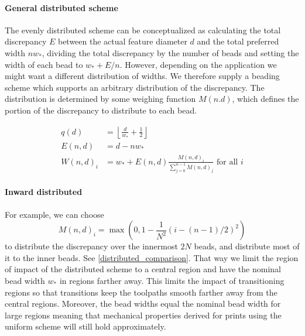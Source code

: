 \paragraph{General distributed scheme}
The evenly distributed scheme can be conceptualized as calculating the total discrepancy $E$ between the actual feature diameter $d$ and the total preferred width $n w_*$, dividing the total discrepancy by the number of beads and setting the width of each bead to 
$w_* + E / n$.
However, depending on the application we might want a different distribution of widths.
We therefore supply a beading scheme which supports an arbitrary distribution of the discrepancy.
The distribution is determined by some weighing function $M(n.d)$, which defines the portion of the discrepancy to distribute to each bead.


\begin{align*}
q(d) &= \left\lfloor \frac{d}{ w_*} + \frac12 \right\rfloor \\
E(n,d) &= d - n w_* \\
W(n,d)_i &= w_* + E(n,d) \frac{M(n,d)_i}{\sum_{j=0}^{n-1} M(n,d)_j} \text{ for all } i 
\end{align*}


\paragraph{Inward distributed}
For example, we can choose 
$$M(n,d)_i = \max(0, 1 - \frac{1}{N^2} (i - (n-1)/2)^2 )$$
to distribute the discrepancy over the innermost $2N$ beads, and distribute most of it to the inner beads.
See \cref{distributed_comparison}.
That way we limit the region of impact of the distributed scheme to a central region and have the nominal bead width $w_*$ in regions farther away.
This limits the impact of transitioning regions so that transitions keep the toolpaths smooth farther away from the central regions. %
Moreover, the bead widths equal the nominal bead width for large regions meaning that mechanical properties derived for prints using the uniform scheme will still hold approximately.




